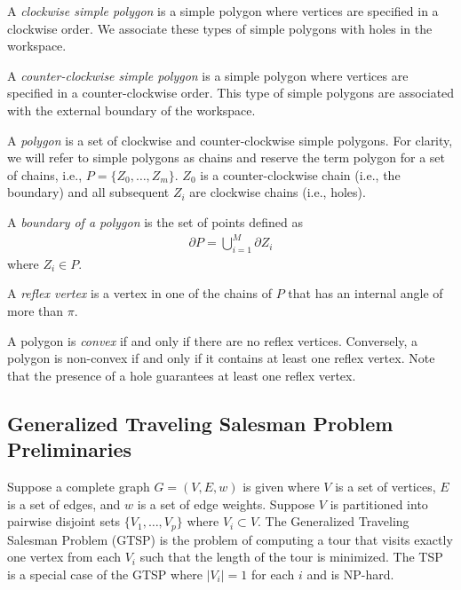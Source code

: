\documentclass[../main.tex]{subfiles}
\begin{document}
\begin{definition}
A \emph{clockwise simple polygon} is a simple polygon where vertices are specified in a clockwise order. We associate these types of simple polygons with holes in the workspace. 
\end{definition}

\begin{definition}
A \emph{counter-clockwise simple polygon} is a simple polygon where vertices are specified in a counter-clockwise order. This type of simple polygons are associated with the external boundary of the workspace.
\end{definition}

\begin{definition}[Polygon]
A \emph{polygon} is a set of clockwise and counter-clockwise simple polygons. For clarity, we will refer to simple polygons as chains and reserve the term polygon for a set of chains, i.e., $P=\{Z_0,\ldots,Z_m\}$. $Z_0$ is a counter-clockwise chain (i.e., the boundary) and all subsequent $Z_i$ are clockwise chains (i.e., holes). 
\end{definition}

\begin{definition}
A \emph{boundary of a polygon} is the set of points defined as
	\begin{equation}
	\begin{aligned}
 		\partial P=\bigcup^M_{i=1}\partial Z_i
	\end{aligned}
	\end{equation}
where $Z_i\in P$.
\end{definition}

\begin{definition}
A \emph{reflex vertex} is a vertex in one of the chains of $P$ that has an internal angle of more than $\pi$.
\end{definition}

\begin{definition}
A polygon is \emph{convex} if and only if there are no reflex vertices. Conversely, a polygon is non-convex if and only if it contains at least one reflex vertex. Note that the presence of a hole guarantees at least one reflex vertex.
\end{definition}

\subsection{Generalized Traveling Salesman Problem Preliminaries}
Suppose a complete graph $G=(V,E,w)$ is given where $V$ is a set of vertices, $E$ is a set of edges, and $w$ is a set of edge weights. Suppose $V$ is partitioned into pairwise disjoint sets $\{V_1,\ldots,V_p\}$ where $V_i\subset V$. The Generalized Traveling Salesman Problem (GTSP) is the problem of computing a tour that visits exactly one vertex from each $V_i$ such that the length of the tour is minimized. The TSP is a special case of the GTSP where $|V_i|=1$ for each $i$ and is NP-hard.
\end{document}
